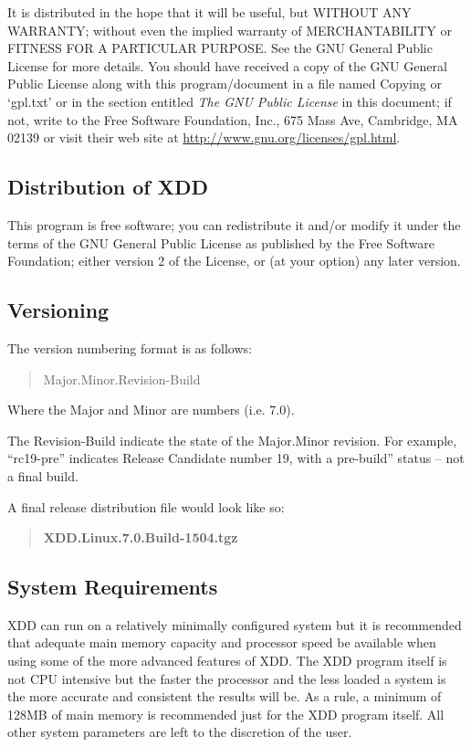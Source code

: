 It is distributed in the hope that it will be useful, but WITHOUT ANY WARRANTY; without even the implied warranty of MERCHANTABILITY or FITNESS FOR A PARTICULAR PURPOSE. See the GNU General Public License for more details. You should have received a copy of the GNU General Public License along with this program/document in a file named \textquotesingle Copying\textquotesingle{} or `gpl.txt' or in the section entitled \emph{The GNU Public License} in this document; if not, write to the Free Software Foundation, Inc., 675 Mass Ave, Cambridge, MA 02139 or visit their web site at \url{http://www.gnu.org/licenses/gpl.html}.

\subsection{Distribution of XDD}\label{distribution-of-xdd}

This program is free software; you can redistribute it and/or modify it under the terms of the GNU General Public License as published by the Free Software Foundation; either version 2 of the License, or (at your option) any later version.

\subsection{Versioning}\label{versioning}

The version numbering format is as follows:

\begin{quote}
Major.Minor.Revision-Build
\end{quote}

Where the Major and Minor are numbers (i.e. 7.0).

The Revision-Build indicate the state of the Major.Minor revision. For example, ``rc19-pre'' indicates Release Candidate number 19, with a pre-build'' status -- not a final build.

A final release distribution file would look like so:

\begin{quote}
\textbf{XDD.Linux.7.0.Build-1504.tgz}
\end{quote}

\subsection{System Requirements}\label{system-requirements}

XDD can run on a relatively minimally configured system but it is recommended that adequate main memory capacity and processor speed be available when using some of the more advanced features of XDD. The XDD program itself is not CPU intensive but the faster the processor and the less loaded a system is the more accurate and consistent the results will be. As a rule, a minimum of 128MB of main memory is recommended just for the XDD program itself. All other system parameters are left to the discretion of the user.

